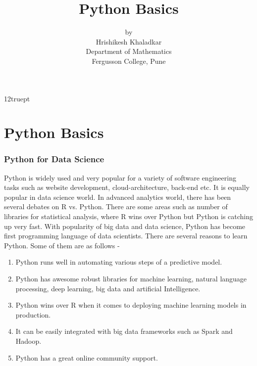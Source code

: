 \documentclass{beamer}
\theoremstyle{plain}
\theoremstyle{definition}
\begin{document}
\baselineskip 12truept
\title{Python Basics}
\author[Hrishikesh Khaladkar,Fergusson College, Pune]{by\\Hrishikesh Khaladkar\\Department of Mathematics \\ Fergusson College, Pune}
\vspace{0.5cm} 
\frame{\titlepage}
\section{Python Basics}
\begin{frame}
      \frametitle{Python for Data Science}
      Python is widely used and very popular for a variety of software engineering tasks such as website development, cloud-architecture, back-end etc. It is equally popular in data science world. In advanced analytics world, there has been several debates on R vs. Python. There are some areas such as number of libraries for statistical analysis, where R wins over Python but Python is catching up very fast. With popularity of big data and data science, Python has become first programming language of data scientists.
       There are several reasons to learn Python. Some of them are as follows -
       \begin{enumerate}
      \item  Python runs well in automating various steps of a predictive model. 
       \item Python has awesome robust libraries for machine learning, natural language processing, deep learning, big data and artificial Intelligence. 
       \item Python wins over R when it comes to deploying machine learning models in production.
      \item It can be easily integrated with big data frameworks such as Spark and Hadoop.
      \item  Python has a great online community support.
    \end{enumerate}

\end{frame}
\end{document}
